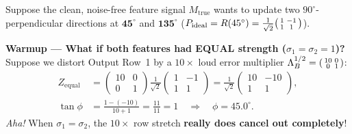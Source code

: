 \documentclass[11pt]{article}
\begin{document}
\begin{toybox}
Suppose the clean, noise-free feature signal $M_{\mathrm{true}}$ wants to update two $90^\circ$-perpendicular directions at $\mathbf{45^\circ}$ and $\mathbf{135^\circ}$ ($P_{\mathrm{ideal}} = R(45^\circ) = \frac{1}{\sqrt{2}}\begin{psmallmatrix} 1 & -1 \\ 1 & 1 \end{psmallmatrix}$).

\textbf{Warmup --- What if both features had EQUAL strength ($\sigma_1 = \sigma_2 = 1$)?}
Suppose we distort Output Row~1 by a $10\times$ loud error multiplier $\Lambda_B^{1/2} = \begin{psmallmatrix} 10 & 0 \\ 0 & 1 \end{psmallmatrix}$:
\begin{align*}
  Z_{\mathrm{equal}}
  &= \begin{pmatrix} 10 & 0 \\ 0 & 1 \end{pmatrix} \frac{1}{\sqrt{2}}\begin{pmatrix} 1 & -1 \\ 1 & 1 \end{pmatrix}
   = \frac{1}{\sqrt{2}}\begin{pmatrix} 10 & -10 \\ 1 & 1 \end{pmatrix}, \\
  \tan\phi &= \frac{1 - (-10)}{10 + 1} = \frac{11}{11} = 1 \quad\Longrightarrow\quad \phi = \mathbf{45.0^\circ}.
\end{align*}
\emph{Aha!} When $\sigma_1 = \sigma_2$, the $10\times$ row stretch \textbf{really does cancel out completely}!


\end{toybox}
\end{document}
